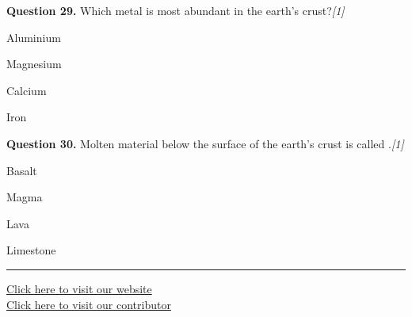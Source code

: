 \documentclass[11pt,a4paper]{article}
\newcommand{\pts}[1]{\hfill \textit{[#1]}}
\begin{document}
\medskip

\noindent \textbf{Question 29.} Which metal is most abundant in the earth's crust?\pts{1}
\begin{parts}
  \item Aluminium
  \item Magnesium
  \item Calcium
  \item Iron
\end{parts}

\medskip

\noindent \textbf{Question 30.} Molten material below the surface of the earth's crust is called \underline{\hspace{2cm}}.\pts{1}
\begin{parts}
  \item Basalt
  \item Magma
  \item Lava
  \item Limestone
\end{parts}

\vfill
\rule{\linewidth}{0.4pt}

\begin{center}\small
\href{https://bhu-exam.vercel.app/}{Click here to visit our website}\\[4pt]
\href{https://me-aryan.vercel.app/}{Click here to visit our contributor}
\end{center}
\end{document}
